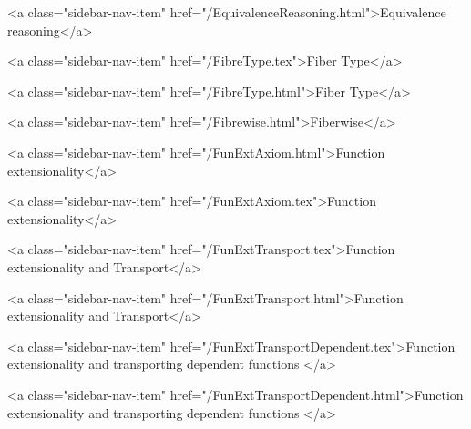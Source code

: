       
    
      
        
          <a class="sidebar-nav-item" href="/EquivalenceReasoning.html">Equivalence reasoning</a>
        
      
    
      
        
          <a class="sidebar-nav-item" href="/FibreType.tex">Fiber Type</a>
        
      
    
      
        
          <a class="sidebar-nav-item" href="/FibreType.html">Fiber Type</a>
        
      
    
      
        
          <a class="sidebar-nav-item" href="/Fibrewise.html">Fiberwise</a>
        
      
    
      
        
          <a class="sidebar-nav-item" href="/FunExtAxiom.html">Function extensionality</a>
        
      
    
      
        
          <a class="sidebar-nav-item" href="/FunExtAxiom.tex">Function extensionality</a>
        
      
    
      
        
          <a class="sidebar-nav-item" href="/FunExtTransport.tex">Function extensionality and Transport</a>
        
      
    
      
        
          <a class="sidebar-nav-item" href="/FunExtTransport.html">Function extensionality and Transport</a>
        
      
    
      
        
          <a class="sidebar-nav-item" href="/FunExtTransportDependent.tex">Function extensionality and transporting dependent functions </a>
        
      
    
      
        
          <a class="sidebar-nav-item" href="/FunExtTransportDependent.html">Function extensionality and transporting dependent functions </a>
        
      
    
